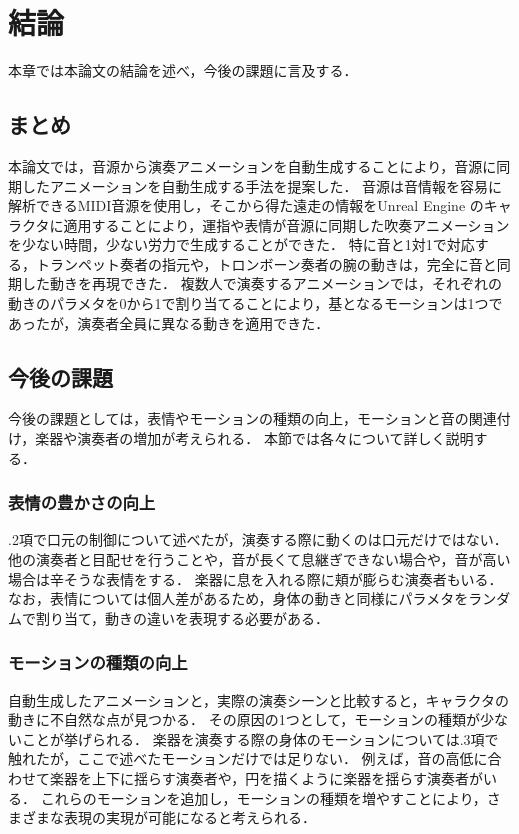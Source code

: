 \chapter{結論}
\label{chap:conclusion}
本章では本論文の結論を述べ，今後の課題に言及する．

\section{まとめ}
本論文では，音源から演奏アニメーションを自動生成することにより，音源に同期したアニメーションを自動生成する手法を提案した．
音源は音情報を容易に解析できるMIDI音源を使用し，そこから得た遠走の情報をUnreal Engine のキャラクタに適用することにより，運指や表情が音源に同期した吹奏アニメーションを少ない時間，少ない労力で生成することができた．
特に音と1対1で対応する，トランペット奏者の指元や，トロンボーン奏者の腕の動きは，完全に音と同期した動きを再現できた．
複数人で演奏するアニメーションでは，それぞれの動きのパラメタを0から1で割り当てることにより，基となるモーションは1つであったが，演奏者全員に異なる動きを適用できた．

\section{今後の課題}
今後の課題としては，表情やモーションの種類の向上，モーションと音の関連付け，楽器や演奏者の増加が考えられる．
本節では各々について詳しく説明する．

\subsection{表情の豊かさの向上}
{.2項}で口元の制御について述べたが，演奏する際に動くのは口元だけではない．
他の演奏者と目配せを行うことや，音が長くて息継ぎできない場合や，音が高い場合は辛そうな表情をする．
楽器に息を入れる際に頬が膨らむ演奏者もいる．
なお，表情については個人差があるため，身体の動きと同様にパラメタをランダムで割り当て，動きの違いを表現する必要がある．

\subsection{モーションの種類の向上}
自動生成したアニメーションと，実際の演奏シーンと比較すると，キャラクタの動きに不自然な点が見つかる．
その原因の1つとして，モーションの種類が少ないことが挙げられる．
楽器を演奏する際の身体のモーションについては{.3項}で触れたが，ここで述べたモーションだけでは足りない．
例えば，音の高低に合わせて楽器を上下に揺らす演奏者や，円を描くように楽器を揺らす演奏者がいる．
これらのモーションを追加し，モーションの種類を増やすことにより，さまざまな表現の実現が可能になると考えられる．

